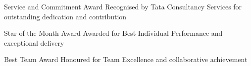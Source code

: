 
\begin{cvhonors}

  \cvhonor
    {Service and Commitment Award}
    {Recognised by Tata Consultancy Services for outstanding dedication and contribution}
    {}
    {}

  \cvhonor
    {Star of the Month Award}
    {Awarded for Best Individual Performance and exceptional delivery}
    {}
    {}

  \cvhonor
    {Best Team Award}
    {Honoured for Team Excellence and collaborative achievement}
    {}
    {}

\end{cvhonors}